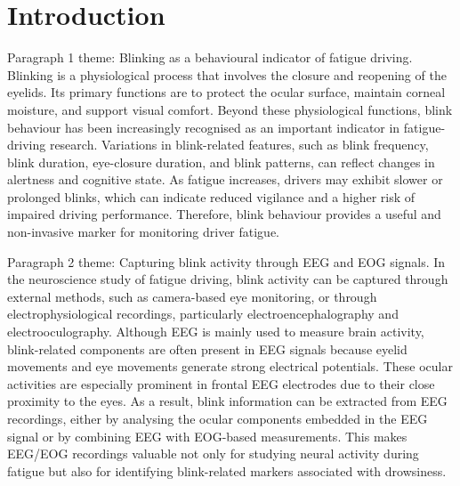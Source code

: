 \section{Introduction}



Paragraph 1 theme: Blinking as a behavioural indicator of fatigue driving.
Blinking is a physiological process that involves the closure and reopening of the eyelids. Its primary functions are to protect the ocular surface, maintain corneal moisture, and support visual comfort. Beyond these physiological functions, blink behaviour has been increasingly recognised as an important indicator in fatigue-driving research. Variations in blink-related features, such as blink frequency, blink duration, eye-closure duration, and blink patterns, can reflect changes in alertness and cognitive state. As fatigue increases, drivers may exhibit slower or prolonged blinks, which can indicate reduced vigilance and a higher risk of impaired driving performance. Therefore, blink behaviour provides a useful and non-invasive marker for monitoring driver fatigue.

Paragraph 2 theme: Capturing blink activity through EEG and EOG signals.
In the neuroscience study of fatigue driving, blink activity can be captured through external methods, such as camera-based eye monitoring, or through electrophysiological recordings, particularly electroencephalography and electrooculography. Although EEG is mainly used to measure brain activity, blink-related components are often present in EEG signals because eyelid movements and eye movements generate strong electrical potentials. These ocular activities are especially prominent in frontal EEG electrodes due to their close proximity to the eyes. As a result, blink information can be extracted from EEG recordings, either by analysing the ocular components embedded in the EEG signal or by combining EEG with EOG-based measurements. This makes EEG/EOG recordings valuable not only for studying neural activity during fatigue but also for identifying blink-related markers associated with drowsiness.

